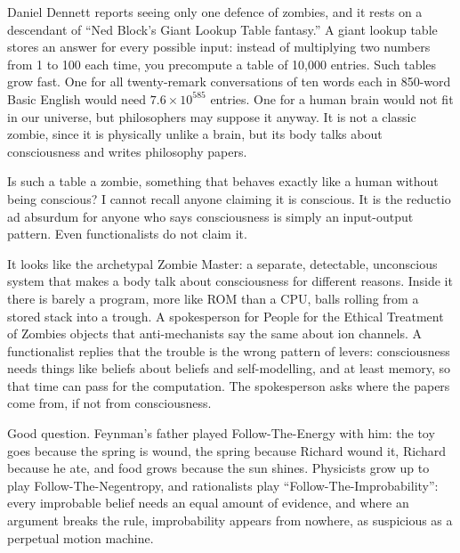 
Daniel Dennett reports seeing only one defence of zombies, and it rests on a descendant of ``Ned Block's Giant Lookup Table fantasy.'' A giant lookup table stores an answer for every possible input: instead of multiplying two numbers from 1 to 100 each time, you precompute a table of 10,000 entries. Such tables grow fast. One for all twenty-remark conversations of ten words each in 850-word Basic English would need $7.6 \times 10^{585}$ entries. One for a human brain would not fit in our universe, but philosophers may suppose it anyway. It is not a classic zombie, since it is physically unlike a brain, but its body talks about consciousness and writes philosophy papers.

Is such a table a zombie, something that behaves exactly like a human without being conscious? I cannot recall anyone claiming it is conscious. It is the reductio ad absurdum for anyone who says consciousness is simply an input-output pattern. Even functionalists do not claim it. 

It looks like the archetypal Zombie Master: a separate, detectable, unconscious system that makes a body talk about consciousness for different reasons. Inside it there is barely a program, more like ROM than a CPU, balls rolling from a stored stack into a trough. A spokesperson for People for the Ethical Treatment of Zombies objects that anti-mechanists say the same about ion channels. A functionalist replies that the trouble is the wrong pattern of levers: consciousness needs things like beliefs about beliefs and self-modelling, and at least memory, so that time can pass for the computation. The spokesperson asks where the papers come from, if not from consciousness.

Good question. Feynman's father played Follow-The-Energy with him: the toy goes because the spring is wound, the spring because Richard wound it, Richard because he ate, and food grows because the sun shines. Physicists grow up to play Follow-The-Negentropy, and rationalists play ``Follow-The-Improbability'': every improbable belief needs an equal amount of evidence, and where an argument breaks the rule, improbability appears from nowhere, as suspicious as a perpetual motion machine.

